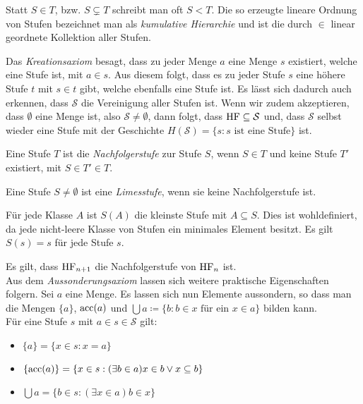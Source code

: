 Statt $S\in T$, bzw. $S\subsetneq T$ schreibt man oft $S<T$. Die so erzeugte lineare Ordnung von Stufen bezeichnet man als \textit{kumulative Hierarchie} und ist die durch $\in$ linear geordnete Kollektion aller Stufen.

Das \textit{Kreationsaxiom} besagt, dass zu jeder Menge $a$ eine Menge $s$ existiert, welche eine Stufe ist, mit $a\in s$. Aus diesem folgt, dass es zu jeder Stufe $s$ eine höhere Stufe $t$ mit $s\in t$ gibt, welche ebenfalls eine Stufe ist. Es lässt sich dadurch auch erkennen, dass $\mathcal{S}$ die Vereinigung aller Stufen ist. Wenn wir zudem akzeptieren, dass $\emptyset$ eine Menge ist, also $\mathcal{S}\neq \emptyset$, dann folgt, dass $\operatorname{HF}\subseteq \mathcal{S}$ und, dass $\mathcal{S}$ selbst wieder eine Stufe mit der Geschichte $H(\mathcal{S})=\{s: s\text{ ist eine Stufe}\}$ ist.

\begin{definition}[Nachfolgerstufe]
	Eine Stufe $T$ ist die \textit{Nachfolgerstufe} zur Stufe $S$, wenn $S\in T$ und keine Stufe $T'$ existiert, mit $S\in T'\in T$.
\end{definition}

\begin{definition}[Limesstufe]
	Eine Stufe $S\neq \emptyset$ ist eine \textit{Limesstufe}, wenn sie keine Nachfolgerstufe ist.
\end{definition}

\begin{definition}
	Für jede Klasse $A$ ist $S(A)$ die kleinste Stufe mit $A\subseteq S$. Dies ist wohldefiniert, da jede nicht-leere Klasse von Stufen ein minimales Element besitzt. Es gilt $S(s)=s$ für jede Stufe $s$.
\end{definition}
Es gilt, dass $\operatorname{HF}_{n+1}$ die Nachfolgerstufe von $\operatorname{HF}_n$ ist.
\\
Aus dem \textit{Aussonderungsaxiom} lassen sich weitere praktische Eigenschaften folgern. Sei $a$ eine Menge. Es lassen sich nun Elemente aussondern, so dass man die Mengen $\{a\}$, $\operatorname{acc}(a)$ und $\bigcup a\coloneqq\{b : b\in x\text{ für ein } x \in a\}$ bilden kann.
\\
Für eine Stufe $s$ mit $a\in s \in \mathcal{S}$ gilt:
\begin{itemize}
	\item $\{a\}=\{x\in s : x=a\}$
	\item $\{\operatorname{acc}(a)\}=\{x\in s: (\exists b\in a)x\in b \lor x\subseteq b\}$
	\item $\bigcup a=\{b\in s : (\exists x\in a)b\in x\}$
\end{itemize}

